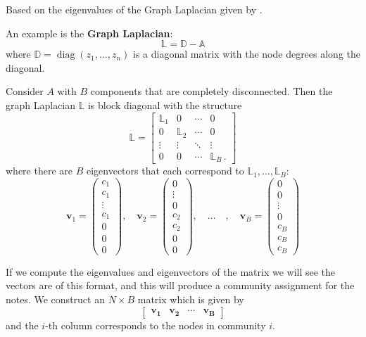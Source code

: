 \documentclass[12pt]{article}
\theoremstyle{definition}
\newcommand{\B}[1]{\boldsymbol{\boldsymbol{#1}}}
\begin{document}
Based on the eigenvalues  of the Graph Laplacian given by . 

An example is the \textbf{Graph Laplacian}: 
\[
\mathbb{L} = \mathbb{D-A}
\]
where $\mathbb D = \operatorname{diag}(z_1,\dots, z_n)$ is a diagonal matrix with the node degrees along the diagonal.

Consider $A$ with $B$ components that are completely disconnected. Then the graph Laplacian $\mathbb L$ is block diagonal with the structure
\[ \mathbb L = 
\begin{bmatrix}
    \mathbb L_1 & 0 & \cdots & 0 \\ 0 & \mathbb L_2 & \cdots & 0 \\ \vdots & \vdots & \ddots & \vdots \\ 0 & 0 & \cdots & \mathbb L_B \,.
\end{bmatrix}
\]
where there are $B$ eigenvectors that each correspond to $\mathbb{L}_1,...,\mathbb{L}_B$: 
\[
\B{v}_1=
\begin{pmatrix}
    c_1 \\ c_1 \\ \vdots \\ c_1 \\ 0 \\ 0 \\ 0
\end{pmatrix}, 
\quad \B{v}_2=
\begin{pmatrix}
    0 \\ \vdots \\ 0 \\ c_2 \\ c_2 \\ 0 \\ 0
\end{pmatrix}, 
\quad ...\quad, \quad \B{v}_B =
\begin{pmatrix}
    0 \\ 0 \\ \vdots \\ 0 \\ c_B \\ c_B \\ c_B
\end{pmatrix}
\]

If we compute the eigenvalues and eigenvectors of the matrix we will see the vectors are of this format, and this will produce a community assignment for the notes. We construct an $N\times B$ matrix which is given by
\[ \begin{bmatrix}
    \boldsymbol{v_1} & \boldsymbol{v_2} & \cdots & \boldsymbol{v_B} 
\end{bmatrix}\]
and the $i$-th column corresponds to the nodes in community $i$.
\end{document}
